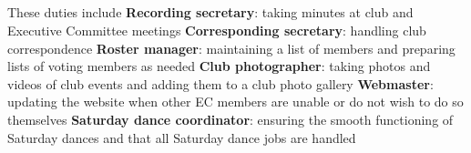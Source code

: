 \documentclass{bylaws}
\begin{document}
\subsection{}These duties include
\duty \textbf{Recording secretary}: taking minutes at club and Executive Committee meetings
\duty \textbf{Corresponding secretary}: handling club correspondence
\duty \textbf{Roster manager}: maintaining a list of members and preparing lists of voting members as needed
\duty \textbf{Club photographer}: taking photos and videos of club events and adding them to a club photo gallery
\duty \textbf{Webmaster}: updating the website when other EC members are unable or do not wish to do so themselves
\duty \textbf{Saturday dance coordinator}: ensuring the smooth functioning of Saturday dances and that all Saturday dance jobs are handled
\end{document}
